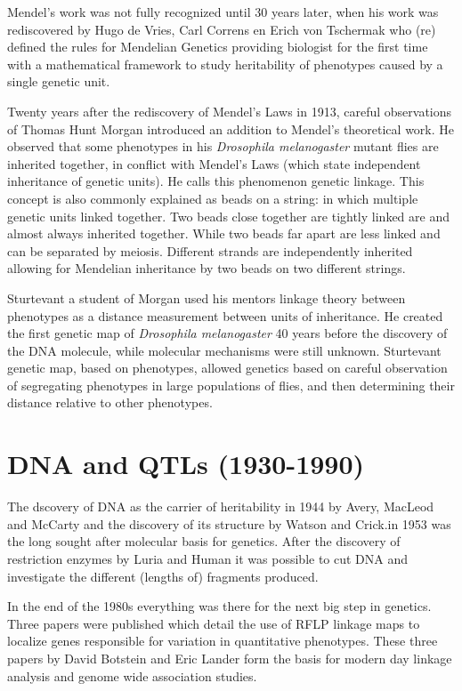 Mendel's work was not fully recognized until 30 years later, when his work was 
rediscovered by Hugo de Vries, Carl Correns en Erich von Tschermak who (re) defined the 
rules for Mendelian Genetics \cite{deVries:1889} providing biologist for the first 
time with a mathematical framework to study heritability of phenotypes caused by a 
single genetic unit.

Twenty years after the rediscovery of Mendel's Laws in 1913, careful observations of 
Thomas Hunt Morgan introduced an addition to Mendel's theoretical work. He observed 
that some phenotypes in his \emph{Drosophila melanogaster} mutant flies are inherited 
together, in conflict with Mendel's Laws (which state independent inheritance of 
genetic units). He calls this phenomenon genetic linkage. This concept is also commonly 
explained as beads on a string: in which multiple genetic units linked together. Two beads 
close together are tightly linked are and almost always inherited together. While 
two beads far apart are less linked and can be separated by meiosis. Different 
strands are independently inherited allowing for Mendelian inheritance by two beads 
on two different strings.

Sturtevant a student of Morgan used his mentors linkage theory between phenotypes 
as a distance measurement between units of inheritance. He created the first genetic 
map of \emph{Drosophila melanogaster} 40 years before the discovery of the DNA molecule, 
while molecular mechanisms were still unknown. Sturtevant genetic map, based on 
phenotypes, allowed genetics based on careful observation of segregating phenotypes in 
large populations of flies, and then determining their distance relative to other 
phenotypes.

\section{DNA and QTLs (1930-1990)}

The dscovery of DNA as the carrier of heritability in 1944 by Avery, MacLeod and McCarty 
\cite{Avery:1944} and the discovery of its structure by Watson and Crick.in 1953 
\cite{Watson:1953} was the long sought after molecular basis for genetics. After the 
discovery of restriction enzymes by Luria and Human \cite{Luria:1952} it was possible 
to cut DNA and investigate the different (lengths of) fragments produced.

In the end of the 1980s everything was there for the next big step in genetics. Three 
papers were published which detail the use of RFLP linkage maps to localize genes 
responsible for variation in quantitative phenotypes. These three papers by David Botstein 
and Eric Lander \cite{Lander:1986, Lander:1987, Lander:1989} form the basis for modern 
day linkage analysis and genome wide association studies. 

